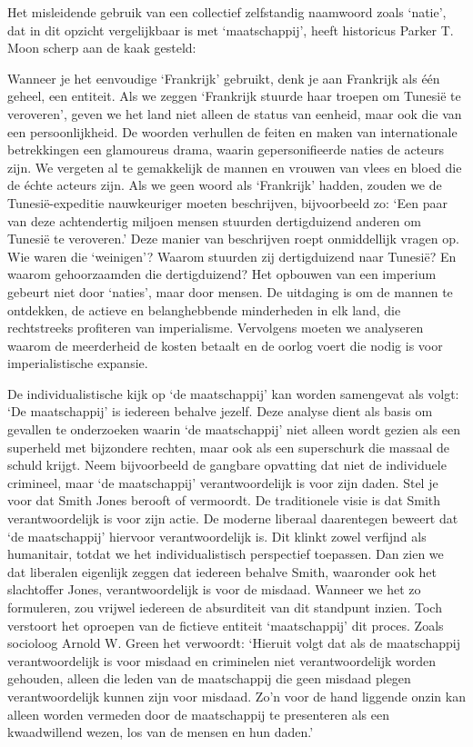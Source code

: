 \documentclass[
  a5paper,
  smalldemyvopaper,10pt,twoside,onecolumn,openright,extrafontsizes,hidelinks]{memoir}
\renewenvironment{quote}%
               {\list{}{\rightmargin=.6cm\leftmargin=.6cm}%
                \itshape \item[]}%
               {\endlist}
\begin{document}
Het misleidende gebruik van een collectief zelfstandig naamwoord zoals
`natie', dat in dit opzicht vergelijkbaar is met `maatschappij', heeft
historicus Parker T. Moon scherp aan de kaak gesteld:

\begin{quote}
Wanneer je het eenvoudige `Frankrijk' gebruikt, denk je aan Frankrijk
als één geheel, een entiteit. Als we zeggen `Frankrijk stuurde haar
troepen om Tunesië te veroveren', geven we het land niet alleen de
status van eenheid, maar ook die van een persoonlijkheid. De woorden
verhullen de feiten en maken van internationale betrekkingen een
glamoureus drama, waarin gepersonifieerde naties de acteurs zijn. We
vergeten al te gemakkelijk de mannen en vrouwen van vlees en bloed die
de échte acteurs zijn. Als we geen woord als `Frankrijk' hadden, zouden
we de Tunesië-expeditie nauwkeuriger moeten beschrijven, bijvoorbeeld
zo: `Een paar van deze achtendertig miljoen mensen stuurden
dertigduizend anderen om Tunesië te veroveren.' Deze manier van
beschrijven roept onmiddellijk vragen op. Wie waren die `weinigen'?
Waarom stuurden zij dertigduizend naar Tunesië? En waarom gehoorzaamden
die dertigduizend? Het opbouwen van een imperium gebeurt niet door
`naties', maar door mensen. De uitdaging is om de mannen te ontdekken,
de actieve en belanghebbende minderheden in elk land, die rechtstreeks
profiteren van imperialisme. Vervolgens moeten we analyseren waarom de
meerderheid de kosten betaalt en de oorlog voert die nodig is voor
imperialistische expansie.
\end{quote}

De individualistische kijk op `de maatschappij' kan worden samengevat
als volgt: `De maatschappij' is iedereen behalve jezelf. Deze analyse
dient als basis om gevallen te onderzoeken waarin `de maatschappij' niet
alleen wordt gezien als een superheld met bijzondere rechten, maar ook
als een superschurk die massaal de schuld krijgt. Neem bijvoorbeeld de
gangbare opvatting dat niet de individuele crimineel, maar `de
maatschappij' verantwoordelijk is voor zijn daden. Stel je voor dat
Smith Jones berooft of vermoordt. De traditionele visie is dat Smith
verantwoordelijk is voor zijn actie. De moderne liberaal daarentegen
beweert dat `de maatschappij' hiervoor verantwoordelijk is. Dit klinkt
zowel verfijnd als humanitair, totdat we het individualistisch
perspectief toepassen. Dan zien we dat liberalen eigenlijk zeggen dat
iedereen behalve Smith, waaronder ook het slachtoffer Jones,
verantwoordelijk is voor de misdaad. Wanneer we het zo formuleren, zou
vrijwel iedereen de absurditeit van dit standpunt inzien. Toch verstoort
het oproepen van de fictieve entiteit `maatschappij' dit proces. Zoals
socioloog Arnold W. Green het verwoordt: `Hieruit volgt dat als de
maatschappij verantwoordelijk is voor misdaad en criminelen niet
verantwoordelijk worden gehouden, alleen die leden van de maatschappij
die geen misdaad plegen verantwoordelijk kunnen zijn voor misdaad. Zo'n
voor de hand liggende onzin kan alleen worden vermeden door de
maatschappij te presenteren als een kwaadwillend wezen, los van de
mensen en hun daden.'
\end{document}
